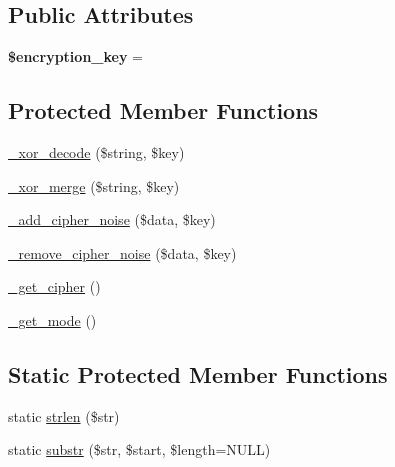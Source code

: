 \subsection*{Public Attributes}
\begin{DoxyCompactItemize}
\item 
\mbox{\label{class_c_i___encrypt_aa54884dad8c5933932015ea663b112a1}} 
{\bfseries \$encryption\+\_\+key} = \textquotesingle{}\textquotesingle{}
\end{DoxyCompactItemize}
\subsection*{Protected Member Functions}
\begin{DoxyCompactItemize}
\item 
\mbox{\hyperlink{class_c_i___encrypt_a43cb2763749875a553f45fbe8e902f7c}{\+\_\+xor\+\_\+decode}} (\$string, \$key)
\item 
\mbox{\hyperlink{class_c_i___encrypt_a9e7f2617191f86339cea5b43f5c217ea}{\+\_\+xor\+\_\+merge}} (\$string, \$key)
\item 
\mbox{\hyperlink{class_c_i___encrypt_a18c358ed9b8f8f9d67876299bccc157a}{\+\_\+add\+\_\+cipher\+\_\+noise}} (\$data, \$key)
\item 
\mbox{\hyperlink{class_c_i___encrypt_a4b60f6a3b86c90e14cae5b861bc20525}{\+\_\+remove\+\_\+cipher\+\_\+noise}} (\$data, \$key)
\item 
\mbox{\hyperlink{class_c_i___encrypt_a2795b333a493ae69ecad8aad47525a32}{\+\_\+get\+\_\+cipher}} ()
\item 
\mbox{\hyperlink{class_c_i___encrypt_adf5eee858f240523b9ba1602cfd06f5a}{\+\_\+get\+\_\+mode}} ()
\end{DoxyCompactItemize}
\subsection*{Static Protected Member Functions}
\begin{DoxyCompactItemize}
\item 
static \mbox{\hyperlink{class_c_i___encrypt_a48d4db55bad3f6788a365b5644ca4b28}{strlen}} (\$str)
\item 
static \mbox{\hyperlink{class_c_i___encrypt_a26c2cfa0ff756c33aa00e093473bfb80}{substr}} (\$str, \$start, \$length=N\+U\+LL)
\end{DoxyCompactItemize}
